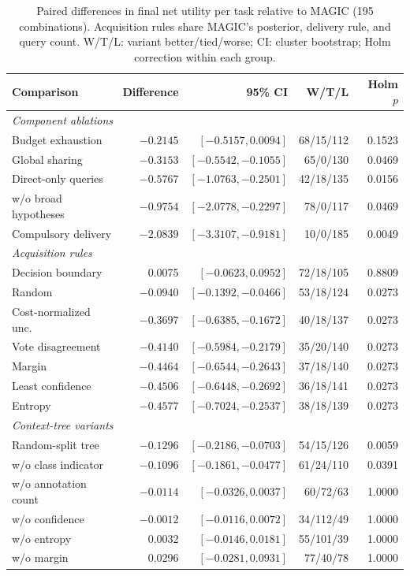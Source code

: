 \documentclass[journal]{IEEEtran}
\newcommand{\smalltable}{\footnotesize\setlength{\tabcolsep}{3.5pt}}
\begin{document}
\begin{table}[t]
\caption{Paired differences in final net utility per task relative to MAGIC (195 combinations). Acquisition rules share MAGIC's posterior, delivery rule, and query count. W/T/L: variant better/tied/worse; CI: cluster bootstrap; Holm correction within each group.}
\label{tab:comparisons}\centering\smalltable\setlength{\tabcolsep}{2pt}
\begin{tabular}{lrrrr}
\toprule
Comparison & Difference & 95\% CI & W/T/L & Holm $p$ \\
\midrule
\multicolumn{5}{l}{\emph{Component ablations}} \\
Budget exhaustion & $-0.2145$ & $[-0.5157, 0.0094]$ & 68/15/112 & 0.1523 \\
Global sharing & $-0.3153$ & $[-0.5542, -0.1055]$ & 65/0/130 & 0.0469 \\
Direct-only queries & $-0.5767$ & $[-1.0763, -0.2501]$ & 42/18/135 & 0.0156 \\
w/o broad hypotheses & $-0.9754$ & $[-2.0778, -0.2297]$ & 78/0/117 & 0.0469 \\
Compulsory delivery & $-2.0839$ & $[-3.3107, -0.9181]$ & 10/0/185 & 0.0049 \\
\midrule
\multicolumn{5}{l}{\emph{Acquisition rules}} \\
Decision boundary & 0.0075 & $[-0.0623, 0.0952]$ & 72/18/105 & 0.8809 \\
Random & $-0.0940$ & $[-0.1392, -0.0466]$ & 53/18/124 & 0.0273 \\
Cost-normalized unc. & $-0.3697$ & $[-0.6385, -0.1672]$ & 40/18/137 & 0.0273 \\
Vote disagreement & $-0.4140$ & $[-0.5984, -0.2179]$ & 35/20/140 & 0.0273 \\
Margin & $-0.4464$ & $[-0.6544, -0.2643]$ & 37/18/140 & 0.0273 \\
Least confidence & $-0.4506$ & $[-0.6448, -0.2692]$ & 36/18/141 & 0.0273 \\
Entropy & $-0.4577$ & $[-0.7024, -0.2537]$ & 38/18/139 & 0.0273 \\
\midrule
\multicolumn{5}{l}{\emph{Context-tree variants}} \\
Random-split tree & $-0.1296$ & $[-0.2186, -0.0703]$ & 54/15/126 & 0.0059 \\
w/o class indicator & $-0.1096$ & $[-0.1861, -0.0477]$ & 61/24/110 & 0.0391 \\
w/o annotation count & $-0.0114$ & $[-0.0326, 0.0037]$ & 60/72/63 & 1.0000 \\
w/o confidence & $-0.0012$ & $[-0.0116, 0.0072]$ & 34/112/49 & 1.0000 \\
w/o entropy & 0.0032 & $[-0.0146, 0.0181]$ & 55/101/39 & 1.0000 \\
w/o margin & 0.0296 & $[-0.0281, 0.0931]$ & 77/40/78 & 1.0000 \\
\bottomrule
\end{tabular}
\end{table}
\end{document}

